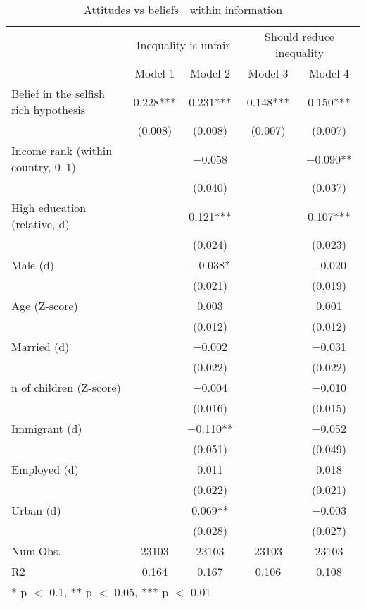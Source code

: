 \begin{table}

\caption{\label{tab:unnamed-chunk-66}Attitudes vs beliefs---within information}
\centering
\begin{tabular}[t]{lcccc}
\toprule
\multicolumn{1}{c}{ } & \multicolumn{2}{c}{Inequality is unfair} & \multicolumn{2}{c}{Should reduce inequality} \\
\cmidrule(l{3pt}r{3pt}){2-3} \cmidrule(l{3pt}r{3pt}){4-5}
  & Model 1 & Model 2 & Model 3 & Model 4\\
\midrule
Belief in the selfish rich hypothesis & \num{0.228}*** & \num{0.231}*** & \num{0.148}*** & \num{0.150}***\\
 & (\num{0.008}) & (\num{0.008}) & (\num{0.007}) & (\num{0.007})\\
Income rank (within country, 0--1) &  & \num{-0.058} &  & \num{-0.090}**\\
 &  & (\num{0.040}) &  & (\num{0.037})\\
High education (relative, d) &  & \num{0.121}*** &  & \num{0.107}***\\
 &  & (\num{0.024}) &  & (\num{0.023})\\
Male (d) &  & \num{-0.038}* &  & \num{-0.020}\\
 &  & (\num{0.021}) &  & (\num{0.019})\\
Age (Z-score) &  & \num{0.003} &  & \num{0.001}\\
 &  & (\num{0.012}) &  & (\num{0.012})\\
Married (d) &  & \num{-0.002} &  & \num{-0.031}\\
 &  & (\num{0.022}) &  & (\num{0.022})\\
n of children (Z-score) &  & \num{-0.004} &  & \num{-0.010}\\
 &  & (\num{0.016}) &  & (\num{0.015})\\
Immigrant (d) &  & \num{-0.110}** &  & \num{-0.052}\\
 &  & (\num{0.051}) &  & (\num{0.049})\\
Employed (d) &  & \num{0.011} &  & \num{0.018}\\
 &  & (\num{0.022}) &  & (\num{0.021})\\
Urban (d) &  & \num{0.069}** &  & \num{-0.003}\\
 &  & (\num{0.028}) &  & (\num{0.027})\\
\midrule
Num.Obs. & \num{23103} & \num{23103} & \num{23103} & \num{23103}\\
R2 & \num{0.164} & \num{0.167} & \num{0.106} & \num{0.108}\\
\bottomrule
\multicolumn{5}{l}{\rule{0pt}{1em}* p $<$ 0.1, ** p $<$ 0.05, *** p $<$ 0.01}\\
\end{tabular}
\end{table}